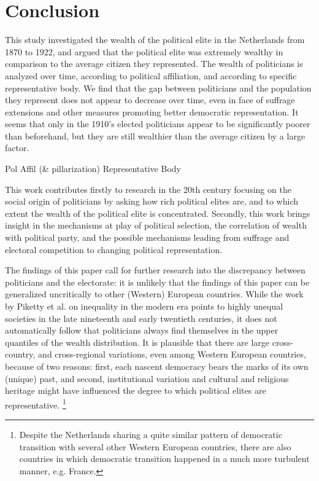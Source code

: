 \section{Conclusion}

This study investigated the wealth of the political elite in the Netherlands from 1870 to 1922, and argued that the political elite was extremely wealthy in comparison to the average citizen they represented. The wealth of politicians is analyzed over time, according to political affiliation, and according to specific representative body. We find that the gap between politicians and the population they represent does not appear to decrease over time, even in face of suffrage extensions and other measures promoting better democratic representation. It seems that only in the 1910's elected politicians appear to be significantly poorer than beforehand, but they are still wealthier than the average citizen by a large factor. 

Pol Affil (\& pillarization)
Representative Body

This work contributes firstly to research in the 20th century focusing on the social origin of politicians by asking how rich political elites are, and to which extent the wealth of the political elite is concentrated. \autocite{van1983toegang, secker1989social, secker1991ministers, van1999eerste, moes2012onder} Secondly, this work brings insight in the mechanisms at play of political selection, the correlation of wealth with political party, and the possible mechanisms leading from suffrage and electoral competition to changing political representation.  \autocite{besley2005political, dal2018progress}

The findings of this paper call for further research into the discrepancy between politicians and the electorate: it is unlikely that the findings of this paper can be generalized uncritically to other (Western) European countries. While the work by Piketty et al. on inequality in the modern era points to highly unequal societies in the late nineteenth and early twentieth centuries, it does not automatically follow that politicians always find themselves in the upper quantiles of the wealth distribution. \autocite{piketty2003income, piketty2014inequality} It is plausible that there are large cross-country, and cross-regional variations, even among Western European countries, because of two reasons: first, each nascent democracy bears the marks of its own (unique) past, and second, institutional variation and cultural and religious heritage might have influenced the degree to which political elites are representative. \autocite{acemoglu2011consequences} \footnote{Despite the Netherlands sharing a quite similar pattern of democratic transition with several other Western European countries, there are also countries in which democratic transition happened in a much more turbulent manner, e.g. France. }

